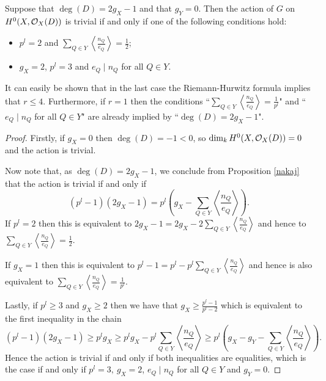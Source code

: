 \begin{cor}
Suppose that $\deg(D)= 2g_X-1$ and that $g_Y=0$. Then the action of $G$ on $H^0(X,{\cal O}_X(D))$ is trivial if and only if one of the following conditions hold:
\begin{itemize}
\item  $p^l=2$ and $\sum_{Q\in Y}\left\langle\frac{n_Q}{e_Q}\right\rangle=\frac{1}{2}$;
\item  $g_X=2$, $p^l=3$ and $e_Q\mid n_Q$ for all $Q\in Y$.
\end{itemize}
\end{cor}


\begin{rem}
It can easily be shown that in the last case the Riemann-Hurwitz formula implies that $r\leq 4$. 
Furthermore, if $r=1$ then the conditions ``$\sum_{Q\in Y}\left\langle\frac{n_Q}{e_Q}\right\rangle=\frac{1}{p^l}$" and ``$e_Q\mid n_Q$ for all $Q\in Y$" are already implied by ``$\deg(D)=2g_X-1$".
\end{rem}

\begin{proof}
Firstly, if $g_X=0$ then $\deg(D)=-1<0$, so $\dim_kH^0(X,{\cal O}_X(D))=0$ and the action is trivial.

Now note that, as $\deg(D)=2g_X-1$, we conclude from Proposition \ref{nakaj} that the action is trivial if and only if 
\begin{equation*}
(p^l-1)(2g_X-1)=p^l\left(g_X-\sum_{Q\in Y}\left\langle\frac{n_Q}{e_Q}\right\rangle\right).
\end{equation*}
If $p^l=2$ then this is equivalent to $2g_X-1=2g_X-2\sum_{Q\in Y}\left\langle\frac{n_Q}{e_Q}\right\rangle$ and hence to $\sum_{Q\in Y}\left\langle\frac{n_Q}{e_Q}\right\rangle=\frac{1}{2}$.

If $g_X=1$ then this is equivalent to $p^l-1=p^l-p^l\sum_{Q\in Y}\left\langle\frac{n_Q}{e_Q}\right\rangle$ and hence is also equivalent to $\sum_{Q\in Y}\left\langle\frac{n_Q}{e_Q}\right\rangle=\frac{1}{p^l}$.

Lastly, if $p^l\geq 3$ and $g_X\geq 2$ then we have that $g_X\geq \frac{p^l-1}{p^l-2}$ which is equivalent to the first inequality in the chain
\begin{equation*}
(p^l-1)(2g_X-1)\geq p^lg_X\geq p^lg_X-p^l\sum_{Q\in Y}\left\langle\frac{n_Q}{e_Q}\right\rangle \geq p^l\left( g_X - g_Y -\sum_{Q\in Y} \left\langle \frac{n_Q}{e_Q} \right\rangle \right).
\end{equation*}
Hence the action is trivial if and only if both inequalities are equalities, which is the case if and only if $p^l=3,\ g_X=2$, $e_Q\mid n_Q$ for all $Q\in Y$ and $g_Y = 0$.
\end{proof}

